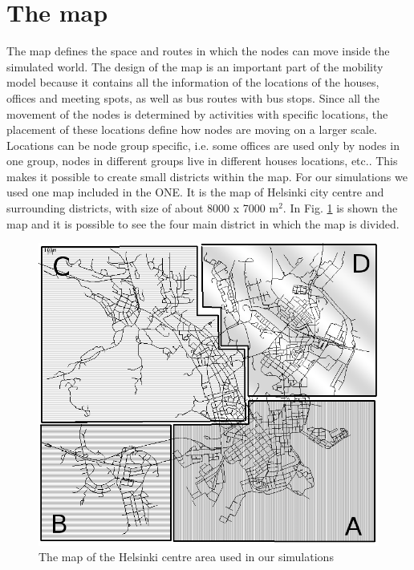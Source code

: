 \section{The map}
\label{mappaONE}
The map defines the space and routes in which the nodes can move inside the simulated world. The design of the map is an important part of the mobility model because it contains all the information of the locations of the houses, offices and meeting spots, as well as bus routes with bus stops. Since all the movement of the nodes is determined by activities with specific locations, the placement of these locations define how nodes are moving on a larger scale. Locations can be node group specific, i.e. some offices are used only by nodes in one group, nodes in different groups live in different houses locations, etc.. This makes it possible to create small districts within the map. For our simulations we used one map included in the ONE. It is the map of Helsinki city centre and surrounding districts, with size of about 8000 x 7000 m$^{2}$. In Fig. \ref{imgMappaABCD} is shown the map and it is possible to see the four main district in which the map is divided. 

\begin{figure}[htpb]
  \begin{center}
    \includegraphics[scale=0.5]{figure/mappa_ABCD.png}
    \caption[Helsinky map]{The map of the Helsinki centre area used in our simulations}    
    \label{imgMappaABCD}
  \end{center}
\end{figure}


